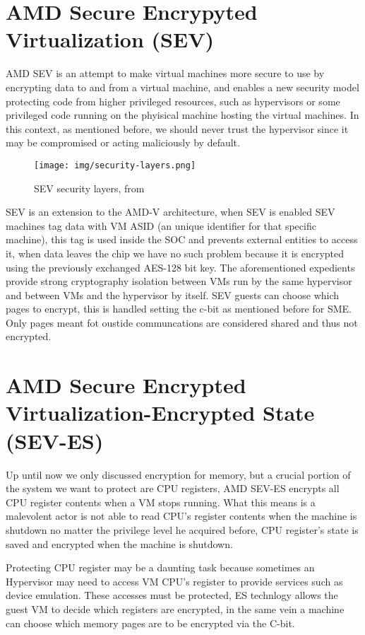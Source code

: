 \documentclass[twocolumn]{article}
\begin{document}
\section{AMD Secure Encrypyted Virtualization (SEV)}

AMD SEV is an attempt to make virtual machines more secure to use by encrypting data to and from a virtual machine, and enables a new security model protecting code from higher privileged resources, such as hypervisors or some privileged code running on the phyisical machine hosting the virtual machines. In this context, as mentioned before, we should never trust the hypervisor since it may be compromised or acting maliciously by default.

\begin{figure}
    \centering
    \texttt{[image: img/security-layers.png]}
    \caption{SEV security layers, from \cite{memory-encryption}}
\end{figure}

SEV is an extension to the AMD-V architecture, when SEV is enabled SEV machines tag data with VM ASID (an unique identifier for that specific machine), this tag is used inside the SOC and prevents external entities to access it, when data leaves the chip we have no such problem because it is encrypted using the previously exchanged AES-128 bit key. The aforementioned expedients provide strong cryptography isolation between VMs run by the same hypervisor and between VMs and the hypervisor by itself. SEV guests can choose which pages to encrypt, this is handled setting the c-bit as mentioned before for SME. Only pages meant fot oustide communcations are considered shared and thus not encrypted.

\section{AMD Secure Encrypted Virtualization-Encrypted State (SEV-ES)}

Up until now we only discussed encryption for memory, but a crucial portion of the system we want to protect are CPU registers, AMD SEV-ES encrypts all CPU register contents when a VM stops running. What this means is a malevolent actor is not able to read CPU's register contents when the machine is shutdown no matter the privilege level he acquired before, CPU register's state is saved and encrypted when the machine is shutdown.

Protecting CPU register may be a daunting task because sometimes an Hypervisor may need to access VM CPU's register to provide services such as device emulation. These accesses must be protected, ES technlogy allows the guest VM to decide which registers are encrypted, in the same vein a machine can choose which memory pages are to be encrypted via the C-bit.
\end{document}
